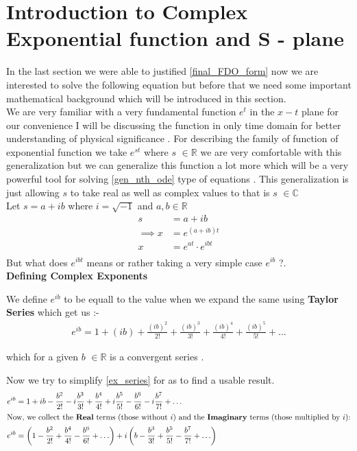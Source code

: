 \documentclass[10pt,twoside]{report}
\begin{document}
\section{Introduction to Complex Exponential function and S - plane}
In the last section we were able to justified \eqref{final_FDO_form} now we are interested to solve the following equation but before that we need some important mathematical background which will be introduced in this section.\\


We  are very familiar with a very fundamental function $e^t$ in the $x-t$ plane for our convenience I will be discussing the function in only time domain for better understanding of physical significance . For describing the family of function of exponential function we take $e^{st}$ where $s$ $\in\mathbb{R}$ we are very comfortable with this generalization but we can generalize this function a lot more which will be a very powerful tool for solving \eqref{gen_nth_ode} type of equations . This generalization is just allowing $s$ to take real as well as complex values to that is $s$ $\in\mathbb{C}$ \\
Let $s = a +ib$ where $i = \sqrt{-1}$ and $a,b\in \mathbb{R}$ 
\begin{align*}
    s &= a + ib\\
    \implies x &= e^{(a + ib)t}\\
    x &= e^{at}\cdot e^{ibt}\\
\end{align*}
But what does $e^{ibt}$ means or rather taking a very simple case $e^{ib}$ ?.\\
\textbf{Defining Complex Exponents}

We define $e^{ib}$ to be equall to the value when we expand the same using \textbf{Taylor Series} which get us :-
\begin{align}
 \label{ex_series}
e^{ib}= 1 + (ib) + \frac{(ib)^2}{2!} + \frac{(ib)^3}{3!} + \frac{(ib)^4}{4!} + \frac{(ib)^5}{5!} + \ldots 
\end{align}

which for a given $b$ $\in\mathbb{R}$ is a convergent series .

Now we try to simplify \eqref{ex_series} for as to find a usable result.
\begin{align*}
    e^{ib} &= 1 + ib - \frac{b^2}{2!} - i\frac{b^3}{3!} + \frac{b^4}{4!} + i\frac{b^5}{5!} - \frac{b^6}{6!} - i\frac{b^7}{7!} + \ldots \\
    \intertext{Now, we collect the \textbf{Real} terms (those without $i$) and the \textbf{Imaginary} terms (those multiplied by $i$):}
    e^{ib} &= \left( 1 - \frac{b^2}{2!} + \frac{b^4}{4!} - \frac{b^6}{6!} + \ldots \right) + i \left( b - \frac{b^3}{3!} + \frac{b^5}{5!} - \frac{b^7}{7!} + \ldots \right)
\end{align*}
\end{document}
